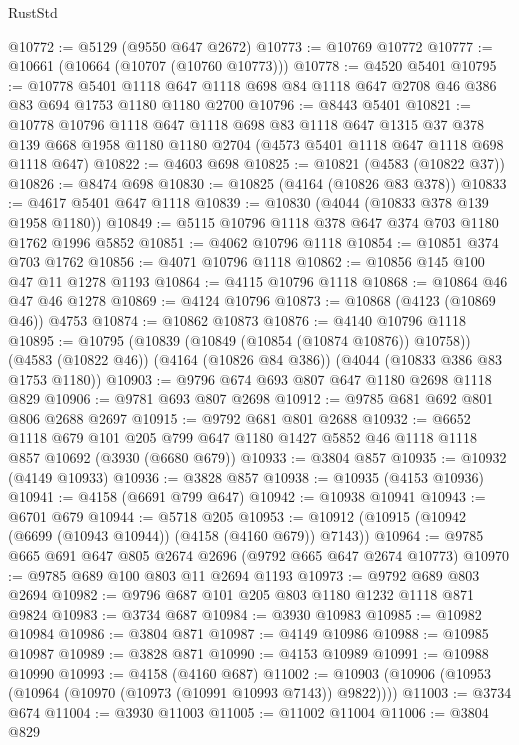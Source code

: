 \begin{lexlean}{RustStd}
\begin{coremodule}
@10772 := @5129 (@9550 @647 @2672)
@10773 := @10769 @10772
@10777 := @10661 (@10664 (@10707 (@10760 @10773)))
@10778 := @4520 @5401
@10795 := @10778
    @5401
    @1118
    @647
    @1118
    @698
    @84
    @1118
    @647
    @2708
    @46
    @386
    @83
    @694
    @1753
    @1180
    @1180
    @2700
@10796 := @8443 @5401
@10821 := @10778
    @10796
    @1118
    @647
    @1118
    @698
    @83
    @1118
    @647
    @1315
    @37
    @378
    @139
    @668
    @1958
    @1180
    @1180
    @2704
    (@4573 @5401 @1118 @647 @1118 @698 @1118 @647)
@10822 := @4603 @698
@10825 := @10821 (@4583 (@10822 @37))
@10826 := @8474 @698
@10830 := @10825 (@4164 (@10826 @83 @378))
@10833 := @4617 @5401 @647 @1118
@10839 := @10830 (@4044 (@10833 @378 @139 @1958 @1180))
@10849 := @5115 @10796 @1118 @378 @647 @374 @703 @1180 @1762 @1996 @5852
@10851 := @4062 @10796 @1118
@10854 := @10851 @374 @703 @1762
@10856 := @4071 @10796 @1118
@10862 := @10856 @145 @100 @47 @11 @1278 @1193
@10864 := @4115 @10796 @1118
@10868 := @10864 @46 @47 @46 @1278
@10869 := @4124 @10796
@10873 := @10868 (@4123 (@10869 @46)) @4753
@10874 := @10862 @10873
@10876 := @4140 @10796 @1118
@10895 := @10795
    (@10839 (@10849 (@10854 (@10874 @10876)) @10758))
    (@4583 (@10822 @46))
    (@4164 (@10826 @84 @386))
    (@4044 (@10833 @386 @83 @1753 @1180))
@10903 := @9796 @674 @693 @807 @647 @1180 @2698 @1118 @829
@10906 := @9781 @693 @807 @2698
@10912 := @9785 @681 @692 @801 @806 @2688 @2697
@10915 := @9792 @681 @801 @2688
@10932 := @6652
    @1118
    @679
    @101
    @205
    @799
    @647
    @1180
    @1427
    @5852
    @46
    @1118
    @1118
    @857
    @10692
    (@3930 (@6680 @679))
@10933 := @3804 @857
@10935 := @10932 (@4149 @10933)
@10936 := @3828 @857
@10938 := @10935 (@4153 @10936)
@10941 := @4158 (@6691 @799 @647)
@10942 := @10938 @10941
@10943 := @6701 @679
@10944 := @5718 @205
@10953 := @10912 (@10915 (@10942 (@6699 (@10943 @10944)) (@4158 (@4160 @679)) @7143))
@10964 := @9785 @665 @691 @647 @805 @2674 @2696 (@9792 @665 @647 @2674 @10773)
@10970 := @9785 @689 @100 @803 @11 @2694 @1193
@10973 := @9792 @689 @803 @2694
@10982 := @9796 @687 @101 @205 @803 @1180 @1232 @1118 @871 @9824
@10983 := @3734 @687
@10984 := @3930 @10983
@10985 := @10982 @10984
@10986 := @3804 @871
@10987 := @4149 @10986
@10988 := @10985 @10987
@10989 := @3828 @871
@10990 := @4153 @10989
@10991 := @10988 @10990
@10993 := @4158 (@4160 @687)
@11002 := @10903 (@10906 (@10953 (@10964 (@10970 (@10973 (@10991 @10993 @7143)) @9822))))
@11003 := @3734 @674
@11004 := @3930 @11003
@11005 := @11002 @11004
@11006 := @3804 @829

\end{coremodule}
\end{lexlean}
